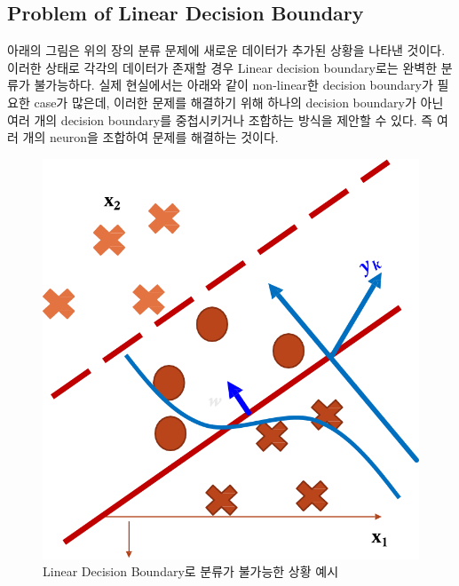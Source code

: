 \documentclass[draft=false]{oblivoir}
\begin{document}
\subsection{Problem of Linear Decision Boundary}
아래의 그림은 위의 장의 분류 문제에 새로운 데이터가 추가된 상황을 나타낸 것이다. 이러한 상태로 각각의 데이터가 존재할 경우 Linear decision boundary로는 완벽한 분류가 불가능하다. 실제 현실에서는 아래와 같이 non-linear한 decision boundary가 필요한 case가 많은데, 이러한 문제를 해결하기 위해 하나의 decision boundary가 아닌 여러 개의 decision boundary를 중첩시키거나 조합하는 방식을 제안할 수 있다. 즉 여러 개의 neuron을 조합하여 문제를 해결하는 것이다. 
\begin{figure}[ht] \centering 
\includegraphics[scale=0.4]{fig14_10.png} 
\caption{Linear Decision Boundary로 분류가 불가능한 상황 예시}
\label{fig:14-10}
\end{figure}
\newpage
\end{document}
